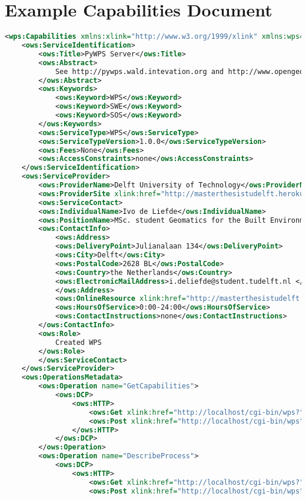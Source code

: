 \section{Example Capabilities Document}
\label{app:wpsCapabilities}
\begin{lstlisting}[language=xml]
<wps:Capabilities xmlns:xlink="http://www.w3.org/1999/xlink" xmlns:wps="http://www.opengis.net/wps/1.0.0" xmlns:ows="http://www.opengis.net/ows/1.1" xmlns:xsi="http://www.w3.org/2001/XMLSchema-instance" service="WPS" version="1.0.0" xml:lang="en-CA" xsi:schemaLocation="http://www.opengis.net/wps/1.0.0 http://schemas.opengis.net/wps/1.0.0/wpsGetCapabilities_response.xsd" updateSequence="1">
	<ows:ServiceIdentification>
		<ows:Title>PyWPS Server</ows:Title>
		<ows:Abstract>
			See http://pywps.wald.intevation.org and http://www.opengeospatial.org/standards/wps
		</ows:Abstract>
		<ows:Keywords>
			<ows:Keyword>WPS</ows:Keyword>
			<ows:Keyword>SWE</ows:Keyword>
			<ows:Keyword>SOS</ows:Keyword>
		</ows:Keywords>
		<ows:ServiceType>WPS</ows:ServiceType>
		<ows:ServiceTypeVersion>1.0.0</ows:ServiceTypeVersion>
		<ows:Fees>None</ows:Fees>
		<ows:AccessConstraints>none</ows:AccessConstraints>
	</ows:ServiceIdentification>
	<ows:ServiceProvider>
		<ows:ProviderName>Delft University of Technology</ows:ProviderName>
		<ows:ProviderSite xlink:href="http://masterthesistudelft.herokuapp.com/"/>
		<ows:ServiceContact>
		<ows:IndividualName>Ivo de Liefde</ows:IndividualName>
		<ows:PositionName>MSc. student Geomatics for the Built Environment</ows:PositionName>
		<ows:ContactInfo>
			<ows:Address>
			<ows:DeliveryPoint>Julianalaan 134</ows:DeliveryPoint>
			<ows:City>Delft</ows:City>
			<ows:PostalCode>2628 BL</ows:PostalCode>
			<ows:Country>the Netherlands</ows:Country>
			<ows:ElectronicMailAddress>i.deliefde@student.tudelft.nl </ows:ElectronicMailAddress>
			</ows:Address>
			<ows:OnlineResource xlink:href="http://masterthesistudelft.herokuapp.com/"/>
			<ows:HoursOfService>0:00-24:00</ows:HoursOfService>
			<ows:ContactInstructions>none</ows:ContactInstructions>
		</ows:ContactInfo>
		<ows:Role>
			Created WPS
		</ows:Role>
		</ows:ServiceContact>
	</ows:ServiceProvider>
	<ows:OperationsMetadata>
		<ows:Operation name="GetCapabilities">
			<ows:DCP>
				<ows:HTTP>
					<ows:Get xlink:href="http://localhost/cgi-bin/wps?"/>
					<ows:Post xlink:href="http://localhost/cgi-bin/wps"/>
				</ows:HTTP>
			</ows:DCP>
		</ows:Operation>
		<ows:Operation name="DescribeProcess">
			<ows:DCP>
				<ows:HTTP>
					<ows:Get xlink:href="http://localhost/cgi-bin/wps?"/>
					<ows:Post xlink:href="http://localhost/cgi-bin/wps"/>

\end{lstlisting}
